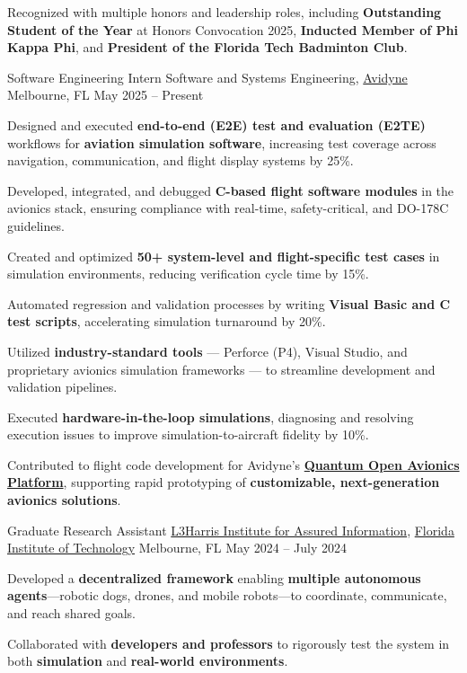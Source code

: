 \begin{cventries}
{\begin{cvitems}
\item Recognized with multiple honors and leadership roles, including \textbf{Outstanding Student of the Year} at Honors Convocation 2025, \textbf{Inducted Member of Phi Kappa Phi}, and \textbf{President of the Florida Tech Badminton Club}.
\end{cvitems}
}
\cventry
{Software Engineering Intern}
{Software and Systems Engineering, \href{https://www.avidyne.com/}{Avidyne}}
{Melbourne, FL}
{May 2025 – Present}
{
\begin{cvitems}
  \item Designed and executed \textbf{end-to-end (E2E) test and evaluation (E2TE)} workflows for \textbf{aviation simulation software}, increasing test coverage across navigation, communication, and flight display systems by 25\%.
  \item Developed, integrated, and debugged \textbf{C-based flight software modules} in the avionics stack, ensuring compliance with real-time, safety-critical, and DO-178C guidelines.
  \item Created and optimized \textbf{50+ system-level and flight-specific test cases} in simulation environments, reducing verification cycle time by 15\%.
  \item Automated regression and validation processes by writing \textbf{Visual Basic and C test scripts}, accelerating simulation turnaround by 20\%.
  \item Utilized \textbf{industry-standard tools} — Perforce (P4), Visual Studio, and proprietary avionics simulation frameworks — to streamline development and validation pipelines.
  \item Executed \textbf{hardware-in-the-loop simulations}, diagnosing and resolving execution issues to improve simulation-to-aircraft fidelity by 10\%.
  \item Contributed to flight code development for Avidyne’s \href{https://quantum.avidyne.com/}{\textbf{Quantum Open Avionics Platform}}, supporting rapid prototyping of \textbf{customizable, next-generation avionics solutions}.
\end{cvitems}
}
\cventry
{Graduate Research Assistant}
{\href{https://research.fit.edu/l3hiai/}{L3Harris Institute for Assured Information}, \href{www.fit.edu}{Florida Institute of Technology}}
{Melbourne, FL}
{May 2024 – July 2024}
{
\begin{cvitems}
\item Developed a \textbf{decentralized framework} enabling \textbf{multiple autonomous agents}—robotic dogs, drones, and mobile robots—to coordinate, communicate, and reach shared goals.
\item Collaborated with \textbf{developers and professors} to rigorously test the system in both \textbf{simulation} and \textbf{real-world environments}.
\end{cvitems}
}


\end{cventries}
